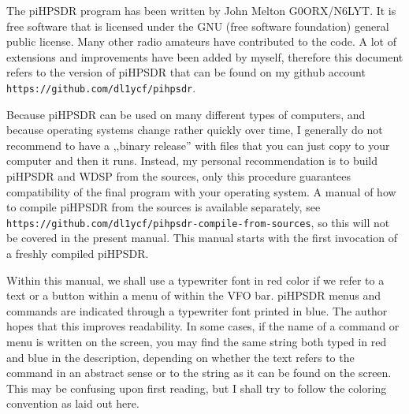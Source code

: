 \documentclass[12pt]{book}
\begin{document}
The piHPSDR program has been written by John Melton G0ORX/N6LYT. It is free software that is licensed under
the GNU (free software foundation) general public license. Many other radio amateurs have contributed to
the code. A lot of extensions and improvements have been added by myself, therefore this document refers
to the version of piHPSDR that can be found on my github account \texttt{https://github.com/dl1ycf/pihpsdr}.

Because piHPSDR can be used on many different types of computers, and because operating systems change
rather quickly over time, I generally do not recommend to have a ,,binary release'' with files that you
can just copy to your computer and then it runs. Instead, my personal recommendation is to build piHPSDR
and WDSP from the sources, only this procedure guarantees compatibility of the final program with your
operating system. A manual of how to compile piHPSDR from the sources is available separately,
see \texttt{https://github.com/dl1ycf/pihpsdr-compile-from-sources}, so this will not be covered in 
the present manual. This manual starts with the first invocation of a freshly compiled piHPSDR.

Within this manual, we shall use a typewriter font in red color if we refer to a text or a button within
a menu of within the VFO bar. piHPSDR menus and commands are indicated through a typewriter font
printed in blue. The author hopes that this improves readability. In some cases, if the name of a command
or  menu is written on the screen, you may find the same string both typed in red and blue in the description,
depending on whether the text refers to the command in an abstract sense or to the string as it can be found
on the screen. This may be confusing upon first reading, but I shall try to follow the coloring convention
as laid out here.
\end{document}
